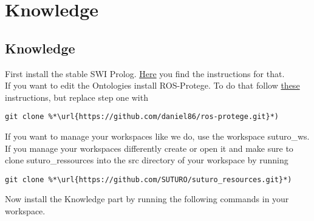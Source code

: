 \documentclass[main.tex]{subfiles}
\begin{document}
\section{Knowledge}
\subsection{Knowledge}
First install the stable SWI Prolog. \href{https://www.swi-prolog.org/build/PPA.html}{Here} you find the instructions for that.\\
If you want to edit the Ontologies install ROS-Protege. To do that follow \href{https://github.com/protegeproject/protege/wiki/Building-from-Source}{these} instructions, but replace step one with\\
\begin{lstlisting}
git clone %*\url{https://github.com/daniel86/ros-protege.git}*)
\end{lstlisting}

If you want to manage your workspaces like we do, use the workspace suturo\_ws.\\
If you manage your workspaces differently create or open it and make sure to clone suturo\_ressources into the src directory of your workspace by running\\
\begin{lstlisting}
git clone %*\url{https://github.com/SUTURO/suturo_resources.git}*) 
\end{lstlisting}
Now install the Knowledge part by running the following commands in your workspace.\\
\begin{mdframed}[backgroundcolor=mygray, rightline=false]

\end{mdframed}
\end{document}
